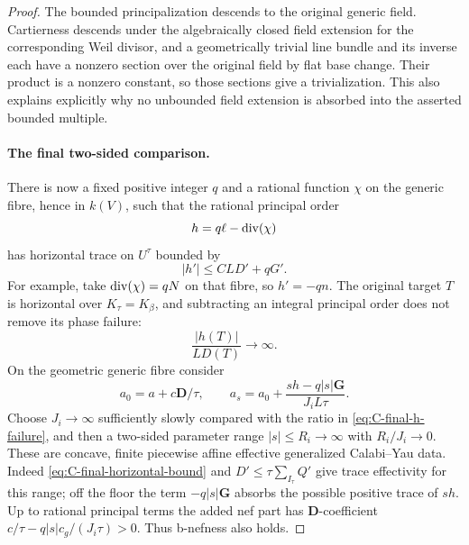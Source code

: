 \begin{proof}
The bounded principalization descends to the original generic field.
Cartierness descends under the algebraically closed field extension for
the corresponding Weil divisor, and a geometrically trivial line
bundle and its inverse each have a nonzero section over the original
field by flat base change.  Their product is a nonzero constant, so
those sections give a trivialization.  This also explains explicitly
why no unbounded field extension is absorbed into the asserted bounded
multiple.

\paragraph{The final two-sided comparison.}
There is now a fixed positive integer $q$ and a rational function
$\chi$ on the generic fibre, hence in $k(V)$, such that the rational
principal order
\[
                         h=q\ell-\operatorname{div}(\chi)
\]
has horizontal trace on $U^\tau$ bounded by
\begin{equation}\label{eq:C-final-horizontal-bound}
                            |h'|\leq CLD'+qG'.
\end{equation}
For example, take $\operatorname{div}(\chi)=qN$ on that fibre, so
$h'=-qn$.  The original target $T$ is horizontal over $K_\tau=K_\beta$,
and subtracting an integral principal order does not remove its phase
failure:
\begin{equation}\label{eq:C-final-h-failure}
                          \frac{|h(T)|}{LD(T)}\longrightarrow\infty.
\end{equation}
On the geometric generic fibre consider
\begin{equation}\label{eq:C-final-family}
 a_0=a+c\mathbf D/\tau,\qquad
 a_s=a_0+\frac{s h-q|s|\mathbf G}{J_iL\tau}.
\end{equation}
Choose $J_i\to\infty$ sufficiently slowly compared with the ratio in
\eqref{eq:C-final-h-failure}, and then a two-sided parameter range
$|s|\leq R_i\to\infty$ with $R_i/J_i\to0$.  These are concave,
finite piecewise affine effective generalized Calabi--Yau data.
Indeed \eqref{eq:C-final-horizontal-bound} and
$D'\leq\tau\sum_{I_\tau}Q'$ give trace effectivity for this range;
off the floor the term $-q|s|\mathbf G$ absorbs the possible positive
trace of $sh$.  Up to rational principal terms the added nef part has
$\mathbf D$-coefficient
$c/\tau-q|s|c_g/(J_i\tau)>0$.  Thus b-nefness also holds.


\end{proof}
